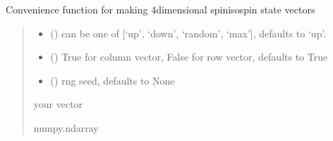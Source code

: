 \documentclass[letterpaper,10pt,english]{sphinxmanual}
\begin{document}
\begin{fulllineitems}
\label{\detokenize{spinbox:spinbox.extras.spinor4}}
\pysigstartsignatures
{}
\pysigstopsignatures
\sphinxAtStartPar
Convenience function for making 4\sphinxhyphen{}dimensional spin\sphinxhyphen{}isospin state vectors
\begin{quote}\begin{description}
\begin{itemize}
\item {} 
\sphinxAtStartPar
{} (\sphinxstyleliteralemphasis{\sphinxupquote{, }}) \textendash{} can be one of {[}‘up’, ‘down’, ‘random’, ‘max’{]}, defaults to ‘up’.

\item {} 
\sphinxAtStartPar
{} (\sphinxstyleliteralemphasis{\sphinxupquote{, }}) \textendash{} True for column vector, False for row vector, defaults to True

\item {} 
\sphinxAtStartPar
{} (\sphinxstyleliteralemphasis{\sphinxupquote{, }}) \textendash{} rng seed, defaults to None

\end{itemize}

\sphinxAtStartPar
your vector

\sphinxAtStartPar
numpy.ndarray

\end{description}\end{quote}

\end{fulllineitems}
\end{document}
